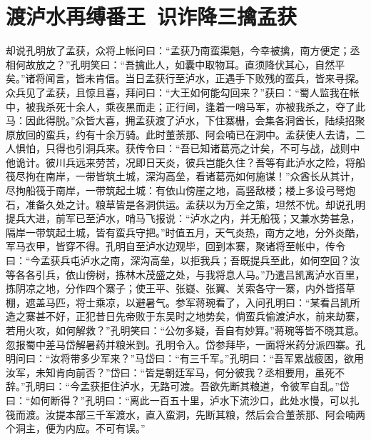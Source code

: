 \chapter{渡泸水再缚番王~识诈降三擒孟获}

却说孔明放了孟获，众将上帐问曰：“孟获乃南蛮渠魁，今幸被擒，南方便定；丞相何故放之？”孔明笑曰：“吾擒此人，如囊中取物耳。直须降伏其心，自然平矣。”诸将闻言，皆未肯信。当日孟获行至泸水，正遇手下败残的蛮兵，皆来寻探。众兵见了孟获，且惊且喜，拜问曰：“大王如何能勾回来？”获曰：“蜀人监我在帐中，被我杀死十余人，乘夜黑而走；正行间，逢着一哨马军，亦被我杀之，夺了此马：因此得脱。”众皆大喜，拥孟获渡了泸水，下住寨栅，会集各洞酋长，陆续招聚原放回的蛮兵，约有十余万骑。此时董荼那、阿会喃已在洞中。孟获使人去请，二人惧怕，只得也引洞兵来。获传令曰：“吾已知诸葛亮之计矣，不可与战，战则中他诡计。彼川兵远来劳苦，况即日天炎，彼兵岂能久住？吾等有此泸水之险，将船筏尽拘在南岸，一带皆筑土城，深沟高垒，看诸葛亮如何施谋！”众酋长从其计，尽拘船筏于南岸，一带筑起土城：有依山傍崖之地，高竖敌楼；楼上多设弓弩炮石，准备久处之计。粮草皆是各洞供运。孟获以为万全之策，坦然不忧。却说孔明提兵大进，前军已至泸水，哨马飞报说：“泸水之内，并无船筏；又兼水势甚急，隔岸一带筑起土城，皆有蛮兵守把。”时值五月，天气炎热，南方之地，分外炎酷，军马衣甲，皆穿不得。孔明自至泸水边观毕，回到本寨，聚诸将至帐中，传令曰：“今孟获兵屯泸水之南，深沟高垒，以拒我兵；吾既提兵至此，如何空回？汝等各各引兵，依山傍树，拣林木茂盛之处，与我将息人马。”乃遣吕凯离泸水百里，拣阴凉之地，分作四个寨子；使王平、张嶷、张翼、关索各守一寨，内外皆搭草棚，遮盖马匹，将士乘凉，以避暑气。参军蒋琬看了，入问孔明曰：“某看吕凯所造之寨甚不好，正犯昔日先帝败于东吴时之地势矣，倘蛮兵偷渡泸水，前来劫寨，若用火攻，如何解救？”孔明笑曰：“公勿多疑，吾自有妙算。”蒋琬等皆不晓其意。忽报蜀中差马岱解暑药并粮米到。孔明令入。岱参拜毕，一面将米药分派四寨。孔明问曰：“汝将带多少军来？”马岱曰：“有三千军。”孔明曰：“吾军累战疲困，欲用汝军，未知肯向前否？”岱曰：“皆是朝廷军马，何分彼我？丞相要用，虽死不辞。”孔明曰：“今孟获拒住泸水，无路可渡。吾欲先断其粮道，令彼军自乱。”岱曰：“如何断得？”孔明曰：“离此一百五十里，泸水下流沙口，此处水慢，可以扎筏而渡。汝提本部三千军渡水，直入蛮洞，先断其粮，然后会合董荼那、阿会喃两个洞主，便为内应。不可有误。”

